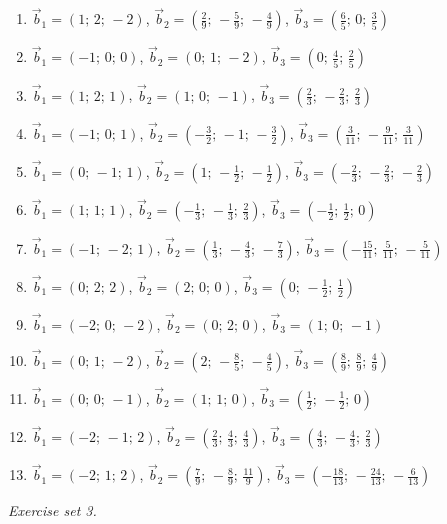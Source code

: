 \begin{enumerate}[label=\arabic*., leftmargin=*, itemsep=1pt]
\item $\vec b_1=(1;\,2;\,-2)$, $\vec b_2=(\frac{2}{9};\,-\frac{5}{9};\,-\frac{4}{9})$, $\vec b_3=(\frac{6}{5};\,0;\,\frac{3}{5})$
\item $\vec b_1=(-1;\,0;\,0)$, $\vec b_2=(0;\,1;\,-2)$, $\vec b_3=(0;\,\frac{4}{5};\,\frac{2}{5})$
\item $\vec b_1=(1;\,2;\,1)$, $\vec b_2=(1;\,0;\,-1)$, $\vec b_3=(\frac{2}{3};\,-\frac{2}{3};\,\frac{2}{3})$
\item $\vec b_1=(-1;\,0;\,1)$, $\vec b_2=(-\frac{3}{2};\,-1;\,-\frac{3}{2})$, $\vec b_3=(\frac{3}{11};\,-\frac{9}{11};\,\frac{3}{11})$
\item $\vec b_1=(0;\,-1;\,1)$, $\vec b_2=(1;\,-\frac{1}{2};\,-\frac{1}{2})$, $\vec b_3=(-\frac{2}{3};\,-\frac{2}{3};\,-\frac{2}{3})$
\item $\vec b_1=(1;\,1;\,1)$, $\vec b_2=(-\frac{1}{3};\,-\frac{1}{3};\,\frac{2}{3})$, $\vec b_3=(-\frac{1}{2};\,\frac{1}{2};\,0)$
\item $\vec b_1=(-1;\,-2;\,1)$, $\vec b_2=(\frac{1}{3};\,-\frac{4}{3};\,-\frac{7}{3})$, $\vec b_3=(-\frac{15}{11};\,\frac{5}{11};\,-\frac{5}{11})$
\item $\vec b_1=(0;\,2;\,2)$, $\vec b_2=(2;\,0;\,0)$, $\vec b_3=(0;\,-\frac{1}{2};\,\frac{1}{2})$
\item $\vec b_1=(-2;\,0;\,-2)$, $\vec b_2=(0;\,2;\,0)$, $\vec b_3=(1;\,0;\,-1)$
\item $\vec b_1=(0;\,1;\,-2)$, $\vec b_2=(2;\,-\frac{8}{5};\,-\frac{4}{5})$, $\vec b_3=(\frac{8}{9};\,\frac{8}{9};\,\frac{4}{9})$
\item $\vec b_1=(0;\,0;\,-1)$, $\vec b_2=(1;\,1;\,0)$, $\vec b_3=(\frac{1}{2};\,-\frac{1}{2};\,0)$
\item $\vec b_1=(-2;\,-1;\,2)$, $\vec b_2=(\frac{2}{3};\,\frac{4}{3};\,\frac{4}{3})$, $\vec b_3=(\frac{4}{3};\,-\frac{4}{3};\,\frac{2}{3})$
\item $\vec b_1=(-2;\,1;\,2)$, $\vec b_2=(\frac{7}{9};\,-\frac{8}{9};\,\frac{11}{9})$, $\vec b_3=(-\frac{18}{13};\,-\frac{24}{13};\,-\frac{6}{13})$
\end{enumerate}
\par\noindent\emph{Exercise set 3.}\nopagebreak

